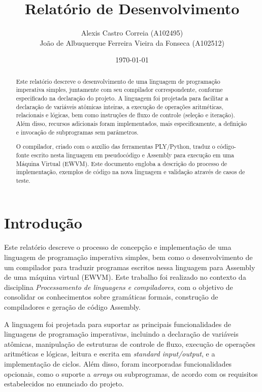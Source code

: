 \documentclass[12pt,a4paper]{report}
\title{Relatório de Desenvolvimento}
\author{Alexis Castro Correia (A102495) \\ João de Albuquerque Ferreira Vieira da Fonseca (A102512)}
\date{\today}
\begin{document}
\maketitle
\begin{abstract}

Este relatório descreve o desenvolvimento de uma linguagem de programação imperativa simples, juntamente com seu compilador correspondente, conforme especificado na declaração do projeto. A linguagem foi projetada para facilitar a declaração de variáveis atômicas inteiras, a execução de operações aritméticas, relacionais e lógicas, bem como instruções de fluxo de controle (seleção e iteração). Além disso, recursos adicionais foram implementados, mais especificamente, a definição e invocação de subprogramas sem parâmetros.

O compilador, criado com o auxílio das ferramentas PLY/Python, traduz o código-fonte escrito nesta linguagem em pseudocódigo e Assembly para execução em uma Máquina Virtual (EWVM). Este documento engloba a descrição do processo de implementação, exemplos de código na nova linguagem e validação através de casos de teste.
\end{abstract}

\tableofcontents %
\chapter{Introdu\c{c}\~{a}o}

Este relatório descreve o processo de concepção e implementação de uma linguagem de programação imperativa simples, bem como o desenvolvimento de um compilador para traduzir programas escritos nessa linguagem para Assembly de uma máquina virtual (EWVM). Este trabalho foi realizado no contexto da disciplina \emph{Processamento de linguagens e compiladores}, com o objetivo de consolidar os conhecimentos sobre gramáticas formais, construção de compiladores e geração de código Assembly.

A linguagem foi projetada para suportar as principais funcionalidades de linguagens de programação imperativas, incluindo a declaração de variáveis atômicas, manipulação de estruturas de controle de fluxo, execução de operações aritméticas e lógicas, leitura e escrita em \emph{standard input/output}, e a implementação de ciclos. Além disso, foram incorporadas funcionalidades opcionais, como o suporte a \emph{arrays} ou subprogramas, de acordo com os requisitos estabelecidos no enunciado do projeto.
\end{document}

